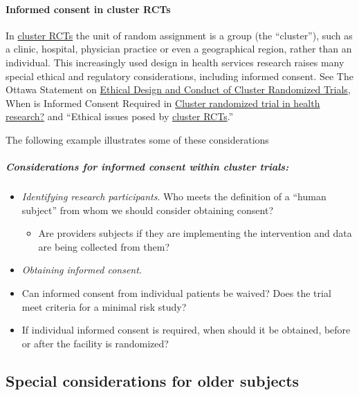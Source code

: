 \documentclass[]{book}
\providecommand{\tightlist}{%
  \setlength{\itemsep}{0pt}\setlength{\parskip}{0pt}}
\theoremstyle{definition}
\theoremstyle{definition}
\theoremstyle{definition}
\theoremstyle{remark}
\begin{document}
\paragraph{Informed consent in cluster
RCTs}\label{informed-consent-in-cluster-rcts}

In
\href{http://www.cochrane-net.org/openlearning/html/modA2-4.htm}{cluster
RCTs} the unit of random assignment is a group (the ``cluster''), such
as a clinic, hospital, physician practice or even a geographical region,
rather than an individual. This increasingly used design in health
services research raises many special ethical and regulatory
considerations, including informed consent. See The Ottawa Statement on
\href{http://journals.plos.org/plosmedicine/article?id=10.1371/journal.pmed.1001346}{Ethical
Design and Conduct of Cluster Randomized Trials}, When is Informed
Consent Required in
\href{http://www.ncbi.nlm.nih.gov/pmc/articles/PMC3184061/pdf/1745-6215-12-202.pdf}{Cluster
randomized trial in health research?} and ``Ethical issues posed by
\href{http://trialsjournal.biomedcentral.com/articles/10.1186/1745-6215-12-100}{cluster
RCTs}.''

The following example illustrates some of these considerations

\subparagraph{Considerations for informed consent within cluster
trials:}\label{considerations-for-informed-consent-within-cluster-trials}

\begin{itemize}
\item
  \emph{Identifying research participants}. Who meets the definition of
  a ``human subject'' from whom we should consider obtaining consent?

  \begin{itemize}
  \tightlist
  \item
    Are providers subjects if they are implementing the intervention and
    data are being collected from them?
  \end{itemize}
\item
  \emph{Obtaining informed consent}.
\item
  Can informed consent from individual patients be waived? Does the
  trial meet criteria for a minimal risk study?
\item
  If individual informed consent is required, when should it be
  obtained, before or after the facility is randomized?
\end{itemize}

\subsection{Special considerations for older
subjects}\label{special-considerations-for-older-subjects-5}
\end{document}
